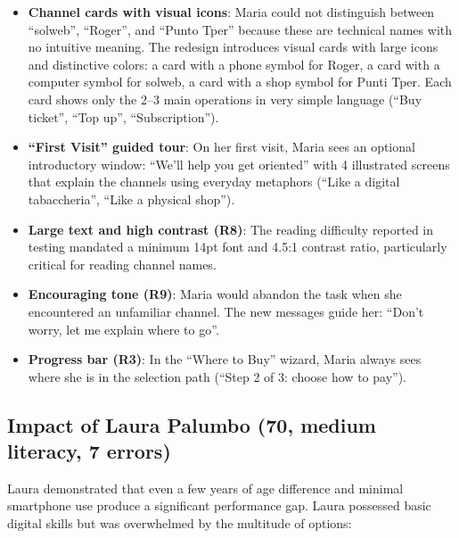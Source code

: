 \begin{itemize}
    \item \textbf{Channel cards with visual icons}: Maria could not distinguish between ``solweb'', ``Roger'', and ``Punto Tper'' because these are technical names with no intuitive meaning. The redesign introduces visual cards with large icons and distinctive colors: a card with a phone symbol for Roger, a card with a computer symbol for solweb, a card with a shop symbol for Punti Tper. Each card shows only the 2--3 main operations in very simple language (``Buy ticket'', ``Top up'', ``Subscription'').
    \item \textbf{``First Visit'' guided tour}: On her first visit, Maria sees an optional introductory window: ``We'll help you get oriented'' with 4 illustrated screens that explain the channels using everyday metaphors (``Like a digital tabaccheria'', ``Like a physical shop'').
    \item \textbf{Large text and high contrast (R8)}: The reading difficulty reported in testing mandated a minimum 14pt font and 4.5:1 contrast ratio, particularly critical for reading channel names.
    \item \textbf{Encouraging tone (R9)}: Maria would abandon the task when she encountered an unfamiliar channel. The new messages guide her: ``Don't worry, let me explain where to go''.
    \item \textbf{Progress bar (R3)}: In the ``Where to Buy'' wizard, Maria always sees where she is in the selection path (``Step 2 of 3: choose how to pay'').
\end{itemize}

\subsection{Impact of Laura Palumbo (70, medium literacy, 7 errors)}

Laura demonstrated that even a few years of age difference and minimal smartphone use produce a significant performance gap. Laura possessed basic digital skills but was overwhelmed by the multitude of options:

